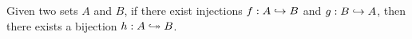 \begin{theorem}
    Given two sets $A$ and $B$,
    if there exist injections $f: A \hookrightarrow B$ and $g: B \hookrightarrow A$,
    then there exists a bijection $h: A \bijection B$.
\end{theorem}


